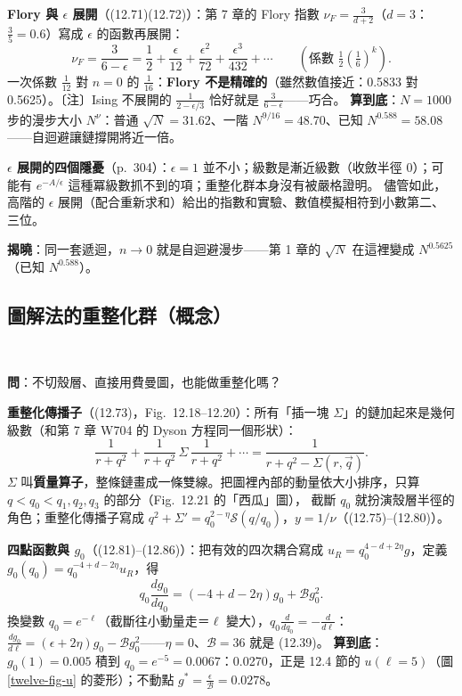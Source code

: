 \textbf{Flory 與 $\epsilon$ 展開}（(12.71)(12.72)）：第 7 章的 Flory 指數 $\nu_F=\frac3{d+2}$（$d=3$：$\frac35=0.6$）寫成 $\epsilon$ 的函數再展開：
\[\nu_F=\frac3{6-\epsilon}=\frac12+\frac\epsilon{12}+\frac{\epsilon^2}{72}+\frac{\epsilon^3}{432}+\cdots\qquad(\text{係數 }\tfrac12(\tfrac16)^k).\tag{12.71--12.72}\]
一次係數 $\frac1{12}$ 對 $n=0$ 的 $\frac1{16}$：\textbf{Flory 不是精確的}（雖然數值接近：0.5833 對 0.5625）。〔注〕Ising 不展開的 $\frac1{2-\epsilon/3}$ 恰好就是 $\frac3{6-\epsilon}$——巧合。
\textbf{算到底}：$N=1000$ 步的漫步大小 $N^\nu$：普通 $\sqrt N=31.62$、一階 $N^{9/16}=48.70$、已知 $N^{0.588}=58.08$——自迴避讓鏈撐開將近一倍。

\textbf{$\epsilon$ 展開的四個隱憂}（p.~304）：$\epsilon=1$ 並不小；級數是漸近級數（收斂半徑 0）；可能有 $e^{-A/\epsilon}$ 這種冪級數抓不到的項；重整化群本身沒有被嚴格證明。
儘管如此，高階的 $\epsilon$ 展開（配合重新求和）給出的指數和實驗、數值模擬相符到小數第二、三位。

\textbf{揭曉}：同一套遞迴，$n\to0$ 就是自迴避漫步——第 1 章的 $\sqrt N$ 在這裡變成 $N^{0.5625}$（已知 $N^{0.588}$）。

\subsection{圖解法的重整化群（概念）}
\leavevmode{}\ \par\nopagebreak

\textbf{問}：不切殼層、直接用費曼圖，也能做重整化嗎？

\textbf{重整化傳播子}（(12.73)，Fig.~12.18--12.20）：所有「插一塊 $\Sigma$」的鏈加起來是幾何級數（和第 7 章 W704 的 Dyson 方程同一個形狀）：
\[\frac1{r+q^2}+\frac1{r+q^2}\,\Sigma\,\frac1{r+q^2}+\cdots=\frac1{r+q^2-\Sigma(r,\vec q)}.\tag{12.73}\]
$\Sigma$ 叫\textbf{質量算子}，整條鏈畫成一條雙線。把圖裡內部的動量依大小排序，只算 $q<q_0<q_1,q_2,q_3$ 的部分（Fig.~12.21 的「西瓜」圖），
截斷 $q_0$ 就扮演殼層半徑的角色；重整化傳播子寫成 $q^2+\Sigma'=q_0^{2-\eta}\mathcal S(q/q_0)$，$y=1/\nu$（(12.75)--(12.80)）。

\textbf{四點函數與 $g_0$}（(12.81)--(12.86)）：把有效的四次耦合寫成 $u_R=q_0^{4-d+2\eta}g$，定義 $g_0(q_0)=q_0^{-4+d-2\eta}u_R$，得
\[q_0\frac{dg_0}{dq_0}=(-4+d-2\eta)g_0+\mathcal Bg_0^2 .\tag{12.86}\]
換變數 $q_0=e^{-\ell}$（截斷往小動量走＝$\ell$ 變大），$q_0\frac d{dq_0}=-\frac d{d\ell}$：$\frac{dg_0}{d\ell}=(\epsilon+2\eta)g_0-\mathcal Bg_0^2$——$\eta=0$、$\mathcal B=36$ 就是 (12.39)。
\textbf{算到底}：$g_0(1)=0.005$ 積到 $q_0=e^{-5}=0.0067$：0.0270，正是 12.4 節的 $u(\ell=5)$（圖 \ref{twelve-fig-u} 的菱形）；不動點 $g^*=\frac\epsilon{\mathcal B}=0.0278$。

